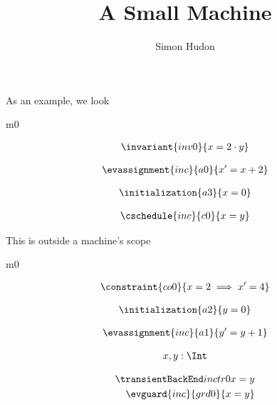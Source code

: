 \documentclass[12pt]{amsart}
\title{A Small Machine}
\author{Simon Hudon}
\date{} %
\begin{document}
\maketitle

As an example, we look

\begin{machine}{m0}


\begin{align*}
\invariant{inv0}
{	x = 2 \cdot y	}
\end{align*}

\begin{align*}
\evassignment{inc}{a0}
{	x' = x + 2	}
\end{align*}

\begin{align*}
\initialization{a3}
{	x = 0	}
\end{align*}


\begin{align*}
\cschedule{inc}{c0}
{	x = y	}
\end{align*}

\end{machine}

This is outside a machine's scope

\begin{machine}{m0}

\begin{align*}
\constraint{co0}
{	x = 2 \implies x' = 4	}
\end{align*}

\begin{align*}
\initialization{a2}
{	y = 0	}
\end{align*}

\begin{align*}
\evassignment{inc}{a1}
{	y' = y + 1	}
\end{align*}

\begin{align*}
\variable{	x,y: \Int}
\end{align*}


\begin{align*}
\transient{inc}{tr0}
{	x = y	} \\
\evguard{inc}{grd0}
{	x = y }
\end{align*}

\end{machine}
\end{document}
